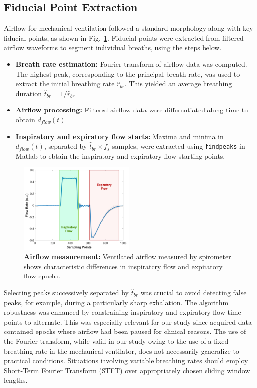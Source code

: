 \documentclass[journal,twoside,web]{ieeecolor}
\begin{document}
\subsection{Fiducial Point Extraction} \label{sec:fiducial}
Airflow for mechanical ventilation followed a standard morphology along with key fiducial points, as shown in Fig.~\ref{fig:airflow}. Fiducial points were extracted from filtered airflow waveforms to segment individual breaths, using the steps below. 
\begin{itemize}
    \item \textbf{Breath rate estimation:} Fourier transform of airflow data was computed. The highest peak, corresponding to the principal breath rate, was used to extract the initial breathing rate $\hat{r}_{br}$. This yielded an average breathing duration $\hat{t}_{br} = 1/\hat{r}_{br}$
    \item \textbf{Airflow processing:} Filtered airflow data were differentiated along time to obtain $d_{flow}(t)$ 
    \item \textbf{Inspiratory and expiratory flow starts:} Maxima and minima in $d_{flow}(t)$, separated by $\hat{t}_{br} \times f_{s}$ samples, were extracted using \texttt{findpeaks} in Matlab to obtain the inspiratory and expiratory flow starting points. 
\end{itemize}
\begin{figure}[htpb]
    \centering
    \includegraphics[width=0.5\textwidth]{airflow.jpg}
    \caption{\textbf{Airflow measurement:} Ventilated airflow measured by spirometer shows characteristic differences in inspiratory flow and expiratory flow epochs.}
    \label{fig:airflow}
\end{figure}
Selecting peaks successively separated by $\hat{t}_{br}$ was crucial to avoid detecting false peaks, for example, during a particularly sharp exhalation. The algorithm robustness was enhanced by constraining inspiratory and expiratory flow time points to alternate. This was especially relevant for our study since acquired data contained epochs where airflow had been paused for clinical reasons. The use of the Fourier transform, while valid in our study owing to the use of a fixed breathing rate in the mechanical ventilator, does not necessarily generalize to practical conditions. Situations involving variable breathing rates should employ Short-Term Fourier Transform (STFT) over appropriately chosen sliding window lengths.
\end{document}
